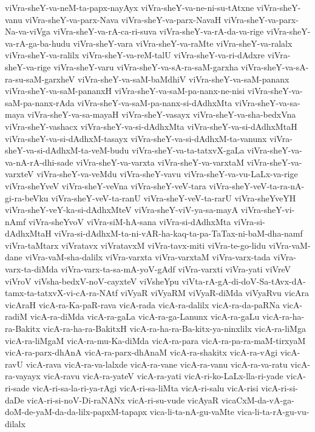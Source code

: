 {viVra-sheY-va-neM-ta-papx-nayAyx
viVra-sheY-va-ne-ni-su-tAtxne
viVra-sheY-vanu
viVra-sheY-va-parx-Nava
viVra-sheY-va-parx-NavaH
viVra-sheY-va-parx-Na-va-viVga
viVra-sheY-va-rA-ca-ri-suva
viVra-sheY-va-rA-da-va-rige
viVra-sheY-va-rA-ga-ba-hudu
viVra-sheY-vara
viVra-sheY-va-raMte
viVra-sheY-va-ralalx
viVra-sheY-va-ralilx
viVra-sheY-va-reM-talU
viVra-sheY-va-ri-dAdxre
viVra-sheY-va-rige
viVra-sheY-varu
viVra-sheY-va-sA-ra-saM-garxha
viVra-sheY-va-sA-ra-su-saM-garxheV
viVra-sheY-va-saM-baMdhiV
viVra-sheY-va-saM-pananx
viVra-sheY-va-saM-pananxH
viVra-sheY-va-saM-pa-nanx-ne-nisi
viVra-sheY-va-saM-pa-nanx-rAda
viVra-sheY-va-saM-pa-nanx-si-dAdhxMta
viVra-sheY-va-sa-maya
viVra-sheY-va-sa-mayaH
viVra-sheY-vasayx
viVra-sheY-va-sha-bedxVna
viVra-sheY-vashacx
viVra-sheY-va-si-dAdhxMta
viVra-sheY-va-si-dAdhxMtaH
viVra-sheY-va-si-dAdhxM-tasayx
viVra-sheY-va-si-dAdhxM-ta-vanunx
viVra-sheY-va-si-dAdhxM-ta-veM-budu
viVra-sheY-va-ta-tatxvX-gaLa
viVra-sheY-va-va-nA-rA-dhi-sade
viVra-sheY-va-varxta
viVra-sheY-va-varxtaM
viVra-sheY-va-varxteV
viVra-sheY-va-veMdu
viVra-sheY-vavu
viVra-sheY-va-vu-LaLx-va-rige
viVra-sheYveV
viVra-sheY-veVna
viVra-sheY-veV-tara
viVra-sheY-veV-ta-ra-nA-gi-ra-beVku
viVra-sheY-veV-ta-ranU
viVra-sheY-veV-ta-rarU
viVra-sheYveYH
viVra-sheY-veY-ka-si-dAdhxMteV
viVra-sheY-viV-ya-sa-mayA
viVra-sheY-vi-nAmf
viVra-sheYvoV
viVra-siM-hA-sana
viVra-si-dAdhxMta
viVra-si-dAdhxMtaH
viVra-si-dAdhxM-ta-ni-vAR-ha-kaq-ta-pa-TaTax-ni-baM-dha-namf
viVra-taMtarx
viVratavx
viVratavxM
viVra-tavx-miti
viVra-te-go-lidu
viVra-vaM-dane
viVra-vaM-sha-dalilx
viVra-varxta
viVra-varxtaM
viVra-varx-tada
viVra-varx-ta-diMda
viVra-varx-ta-sa-mA-yoV-gAdf
viVra-varxti
viVra-yati
viVreV
viVroV
viVsha-bedxV-noV-cayxteV
viVsheYpu
viVta-rA-gA-di-doV-Sa-tAvx-dA-tamx-ta-tatxvX-vi-cA-ra-NAtf
viVyaR
viVyaRM
viVyaR-diMda
viVyaRvu
vicAra
vicAraH
vicA-ra-Ka-paR-rava
vicA-rada
vicA-ra-dalilx
vicA-ra-da-paRNa
vicA-radiM
vicA-ra-diMda
vicA-ra-gaLa
vicA-ra-ga-Lanunx
vicA-ra-gaLu
vicA-ra-ha-ra-Bakitx
vicA-ra-ha-ra-BakitxH
vicA-ra-ha-ra-Ba-kitx-ya-ninxlilx
vicA-ra-liMga
vicA-ra-liMgaM
vicA-ra-mu-Ka-diMda
vicA-ra-para
vicA-ra-pa-ra-maM-tirxyaM
vicA-ra-parx-dhAnA
vicA-ra-parx-dhAnaM
vicA-ra-shakitx
vicA-ra-vAgi
vicA-ravU
vicA-rava
vicA-ra-va-lalxde
vicA-ra-vane
vicA-ra-vanu
vicA-ra-va-ratu
vicA-ra-vayayx
vicA-ravu
vicA-ra-yateV
vicA-ra-yati
vicA-ri-ko-LaLx-lla-ri-yade
vicA-ri-sade
vicA-ri-sa-la-ri-ya-rAgi
vicA-ri-sa-liMta
vicA-ri-salu
vicA-risi
vicA-ri-si-daDe
vicA-ri-si-noV-Di-raNANx
vicA-ri-su-vude
vicAyaR
vicaCxM-da-vA-ga-doM-de-yaM-da-da-lilx-papxM-tapapx
vica-li-ta-nA-gu-vaMte
vica-li-ta-rA-gu-vu-dilalx
}
